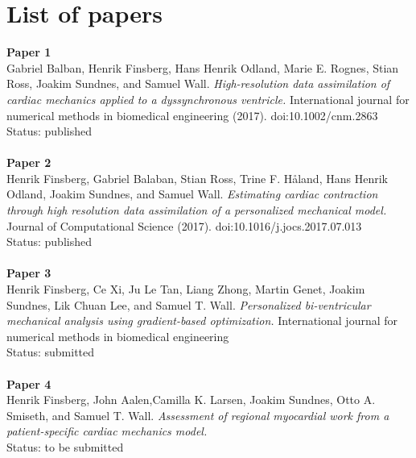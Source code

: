 
\section*{List of papers}

\textbf{Paper 1}
\hfill  \\ \noindent
Gabriel Balban, Henrik Finsberg, Hans Henrik Odland, Marie
E. Rognes, Stian Ross, Joakim Sundnes, and Samuel
Wall. \emph{High-resolution data assimilation of cardiac mechanics
  applied to a dyssynchronous ventricle.}  International journal for
numerical methods in biomedical engineering
(2017). doi:10.1002/cnm.2863
Status: published
\\\\
\noindent
\textbf{Paper 2} 
\hfill  \\ 
Henrik Finsberg, Gabriel Balaban,  Stian Ross, Trine F. H\r{a}land,
Hans Henrik Odland, Joakim Sundnes, and Samuel
Wall. \emph{Estimating cardiac contraction through high resolution
  data assimilation of a personalized mechanical model.} Journal of
Computational Science (2017). doi:10.1016/j.jocs.2017.07.013
\\Status: published
\\\\
\noindent
\textbf{Paper 3}
\hfill  \\
Henrik Finsberg, Ce Xi,  Ju Le Tan,  Liang Zhong, Martin Genet, Joakim
Sundnes, Lik Chuan Lee, and Samuel T. Wall.
\emph{Personalized bi-ventricular mechanical analysis using
  gradient-based optimization.} International journal for
numerical methods in biomedical engineering
\\Status: submitted
\\\\
\noindent
\textbf{Paper 4}
\hfill  \\
Henrik Finsberg, John Aalen,Camilla K.
Larsen, Joakim Sundnes, Otto A. Smiseth, and 
Samuel T. Wall.
\emph{Assessment of regional myocardial work from a
patient-specific cardiac mechanics model.} 
\\Status: to be submitted


